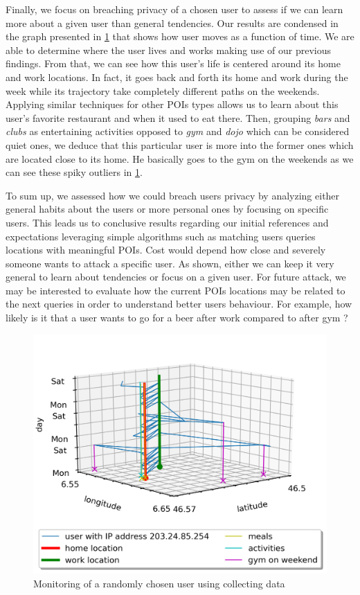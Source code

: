 \documentclass[10pt,conference,compsocconf]{IEEEtran}
\begin{document}
Finally, we focus on breaching privacy of a chosen user to assess if we can learn more about a given user than general tendencies. Our results are condensed in the graph presented in \ref{random_fig} that shows how user moves as a function of time. We are able to determine where the user lives and works making use of our previous findings. From that, we can see how this user's life is centered around its home and work locations. In fact, it goes back and forth its home and work during the week while its trajectory take completely different paths on the weekends. Applying similar techniques for other POIs types allows us to learn about this user's favorite restaurant and when it used to eat there. Then, grouping \textit{bars} and \textit{clubs} as entertaining activities opposed to \textit{gym} and \textit{dojo} which can be considered quiet ones, we deduce that this particular user is more into the former ones which are located close to its home. He basically goes to the gym on the weekends as we can see these spiky outliers in \ref{random_fig}.

To sum up, we assessed how we could breach users privacy by analyzing either general habits about the users or more personal ones by focusing on specific users. This leads us to conclusive results regarding our initial references and expectations leveraging simple algorithms such as matching users queries locations with meaningful POIs. Cost would depend how close and severely someone wants to attack a specific user. As shown, either we can keep it very general to learn about tendencies or focus on a given user. For future attack, we may be interested to evaluate how the current POIs locations may be related to the next queries in order to understand better users behaviour. For example, how likely is it that a user wants to go for a beer after work compared to after gym ?

\begin{figure}
  \includegraphics[width=\columnwidth]{random.png}
  \caption{Monitoring of a randomly chosen user using collecting data}
  \label{random_fig}
\end{figure}
\end{document}
